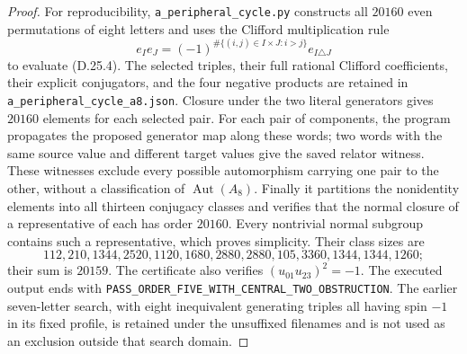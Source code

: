 \begin{proof}
For reproducibility, \texttt{a\_peripheral\_cycle.py} constructs
all $20160$ even permutations of eight letters and uses the
Clifford multiplication rule
\[
 e_Ie_J=(-1)^{\#\{(i,j)\in I\times J:i>j\}}e_{I\triangle J}
 \tag{D.25.10}
\]
to evaluate \textup{(D.25.4)}.  The selected triples, their full
rational Clifford coefficients, their explicit conjugators,
and the four negative products are retained in
\texttt{a\_peripheral\_cycle\_a8.json}.
Closure under the two literal generators gives $20160$
elements for each selected pair.  For each pair of components,
the program propagates the proposed generator map along these
words; two words with the same source value and different
target values give the saved relator witness.  These witnesses
exclude every possible automorphism carrying one pair to the
other, without a classification of $\operatorname{Aut}(A_8)$.
Finally it partitions the nonidentity elements into all
thirteen conjugacy classes and verifies that the normal
closure of a representative of each has order $20160$.
Every nontrivial normal subgroup contains such a representative,
which proves simplicity.  Their class sizes are
\[
 112,210,1344,2520,1120,1680,2880,2880,
 105,3360,1344,1344,1260;
\]
their sum is $20159$.  The certificate also verifies
$(u_{01}u_{23})^2=-1$.  The executed output ends with
\texttt{PASS\_ORDER\_FIVE\_WITH\_CENTRAL\_TWO\_OBSTRUCTION}.
The earlier seven-letter search, with eight inequivalent
generating triples all having spin $-1$ in its fixed profile,
is retained under the unsuffixed filenames and is not used
as an exclusion outside that search domain.
\end{proof}
